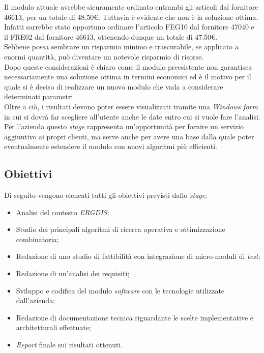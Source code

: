 \noindent Il modulo attuale avrebbe sicuramente ordinato entrambi gli articoli dal fornitore 46613,
per un totale di 48.50€. Tuttavia è evidente che non è la soluzione ottima.
Infatti sarrebbe stato opportuno ordinare l'articolo FEG10 dal fornitore 47040 e il
FRE02 dal fornitore 46613, ottenendo dunque un totale di 47.50€.\\
Sebbene possa sembrare un risparmio minimo e trascurabile, se applicato a enormi quantità, può
diventare un notevole risparmio di risorse.\\

\noindent Dopo queste considerazioni è chiaro come il modulo preesistente non garantisca necessariamente una soluzione ottima in termini economici ed è il motivo per il quale
si è deciso di realizzare un nuovo modulo che vada a considerare determinati parametri.\\

\noindent Oltre a ciò, i risultati devono poter essere visualizzati tramite una \textit{Windows form} in cui si dovrà far scegliere all'utente
anche le date entro cui si vuole fare l'analisi.\\

\noindent Per l'azienda questo \textit{stage} rappresenta un'opportunità per fornire un servizio aggiuntivo ai propri clienti, ma serve anche per avere una base
dalla quale poter eventualmente estendere il modulo con nuovi algoritmi più efficienti.
\newpage
\subsection{Obiettivi}

\noindent Di seguito vengono elencati tutti gli obiettivi previsti dallo \textit{stage}:
\begin{itemize}
    \item Analisi del contesto \textit{ERGDIS};
    \item Studio dei principali algoritmi di ricerca operativa e ottimizzazione combinatoria;
    \item Redazione di uno studio di fattibilità con integrazione di micro-moduli di \textit{test};
    \item Redazione di un'analisi dei requisiti;
    \item Sviluppo e codifica del modulo \textit{software} con le tecnologie utilizzate dall'azienda;
    \item Redazione di documentazione tecnica riguardante le scelte implementative e architetturali effettuate;
    \item \textit{Report} finale sui risultati ottenuti.
\end{itemize}
